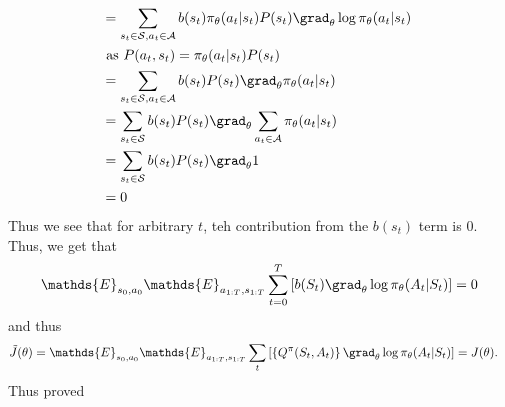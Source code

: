 \begin{tcolorbox}[title = Alternative derivation, breakable]
\begin{align}
        &= \sum_{s_t \in \mathcal{S},a_t\in\mathcal{A}}b(s_t) \pi_{\theta}(a_t|s_t) P(s_t) \grad_{\theta}\log \pi_{\theta}(a_t|s_t) \:\: \nonumber \\
        &\text{ as } P(a_t,s_t) = \pi_{\theta}(a_t|s_t)P(s_t)\\
        &= \sum_{s_t \in \mathcal{S},a_t\in\mathcal{A}}b(s_t) P(s_t) \grad_{\theta} \pi_{\theta}(a_t|s_t) \\
        &= \sum_{s_t \in \mathcal{S}}b(s_t) P(s_t) \grad_{\theta} \sum_{a_t\in\mathcal{A}}\pi_{\theta}(a_t|s_t)\\
        &= \sum_{s_t \in \mathcal{S}}b(s_t) P(s_t) \grad_{\theta} 1 \\
        &= 0
    \end{align}
    Thus we see that for arbitrary $t$, teh contribution from the $b(s_t)$ term is $0$. Thus, we get that 
    \begin{align}
        \mathds{E}_{s_0,a_0} \mathds{E}_{a_{1:T},s_{1:T}} \sum^T_{t=0}\left[ b(S_t)\grad_{\theta}\log \pi_{\theta}(A_t|S_t)\right] = 0
    \end{align}
    and thus 
    \begin{align}
        \tilde{J}(\theta) &=  \mathds{E}_{s_0,a_0}  \mathds{E}_{a_{1:T},s_{1:T}} \sum_{t}\left[ \left\{Q^{\pi}(S_t,A_t)\right\} \grad_{\theta}\log \pi_{\theta}(A_t|S_t)\right] = J(\theta). 
    \end{align}
    Thus proved
\end{tcolorbox}

